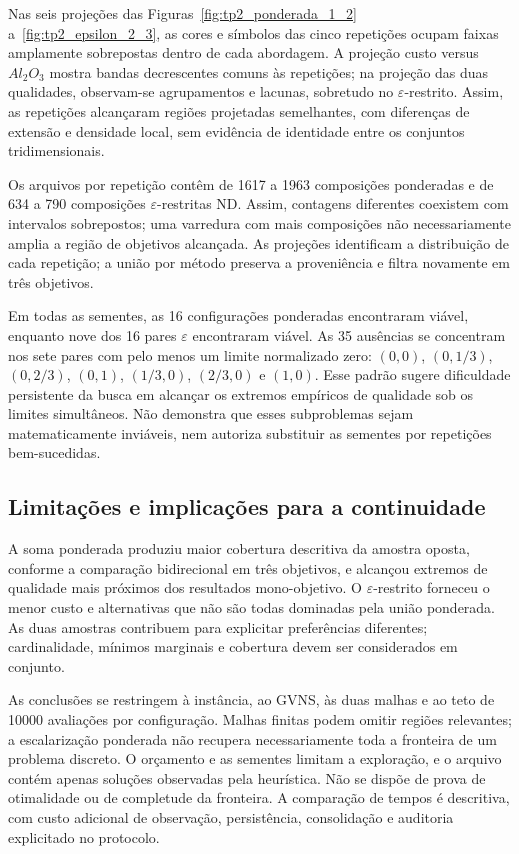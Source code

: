 Nas seis projeções das Figuras~\ref{fig:tp2_ponderada_1_2}
a~\ref{fig:tp2_epsilon_2_3}, as cores e símbolos das cinco repetições
ocupam faixas amplamente sobrepostas dentro de cada abordagem. A projeção
custo versus $Al_2O_3$ mostra bandas decrescentes comuns às repetições;
na projeção das duas qualidades, observam-se agrupamentos e lacunas,
sobretudo no $\varepsilon$-restrito. Assim, as repetições alcançaram regiões
projetadas semelhantes, com diferenças de extensão e densidade local,
sem evidência de identidade entre os conjuntos tridimensionais.

Os arquivos por repetição contêm de \num{1617} a \num{1963} composições
ponderadas e de \num{634} a \num{790} composições $\varepsilon$-restritas
ND. Assim, contagens diferentes coexistem com intervalos sobrepostos;
uma varredura com mais composições não necessariamente amplia a região
de objetivos alcançada. As projeções identificam a distribuição de cada
repetição; a união por método preserva a proveniência e filtra novamente
em três objetivos.

Em todas as sementes, as 16 configurações ponderadas encontraram viável,
enquanto nove dos 16 pares $\varepsilon$ encontraram viável. As 35 ausências
se concentram nos sete pares com pelo menos um limite normalizado zero:
$(0,0)$, $(0,1/3)$, $(0,2/3)$, $(0,1)$, $(1/3,0)$, $(2/3,0)$ e $(1,0)$.
Esse padrão sugere dificuldade persistente da busca em alcançar os
extremos empíricos de qualidade sob os limites simultâneos. Não demonstra
que esses subproblemas sejam matematicamente inviáveis, nem autoriza
substituir as sementes por repetições bem-sucedidas.

\subsection{Limitações e implicações para a continuidade}

A soma ponderada produziu maior cobertura descritiva da amostra oposta,
conforme a comparação bidirecional em três objetivos, e alcançou extremos
de qualidade mais próximos dos resultados mono-objetivo. O
$\varepsilon$-restrito forneceu o menor custo e alternativas que não são
todas dominadas pela união ponderada. As duas amostras contribuem para
explicitar preferências diferentes; cardinalidade, mínimos marginais e
cobertura devem ser considerados em conjunto.

As conclusões se restringem à instância, ao GVNS, às duas malhas e ao teto
de \num{10000} avaliações por configuração. Malhas finitas podem omitir
regiões relevantes; a escalarização ponderada não recupera necessariamente
toda a fronteira de um problema discreto. O orçamento e as sementes
limitam a exploração, e o arquivo contém apenas soluções observadas pela
heurística. Não se dispõe de prova de otimalidade ou de completude da
fronteira. A comparação de tempos é descritiva, com custo adicional de
observação, persistência, consolidação e auditoria explicitado no protocolo.

